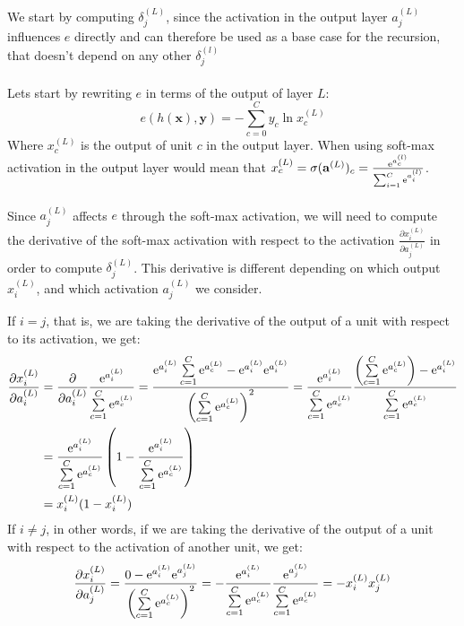 We start by computing $\delta^{(L)}_j$, since the activation in the output layer $a^{(L)}_j$ influences $e$ directly and can therefore be used as a base case for the recursion, that doesn't depend on any other $\delta^{(l)}_j$
\\\\
Lets start by rewriting $e$ in terms of the output of layer $L$:
$$
e(h(\mathbf{x}), \mathbf{y}) = - \sum\limits_{c=0}^C y_c \ln x^{(L)}_c
$$
Where $x^{(L)}_c$ is the output of unit $c$ in the output layer. When using soft-max activation in the output layer would mean that $x^{(L)}_c = \sigma(\mathbf{a}^{(L)})_c = \frac{\mathrm{e}^{a^{(l)}_c}}{\sum_{i=1}^C\mathrm{e}^{a^{(l)}_i}}$.
\\\\
Since $a^{(L)}_j$ affects $e$ through the soft-max activation, we will need to compute the derivative of the soft-max activation with respect to the activation $\frac{\partial x^{(L)}_i}{\partial a^{(L)}_j}$ in order to compute $\delta^{(L)}_j$. This derivative is different depending on which output $x^{(L)}_i$, and which activation $a^{(L)}_j$ we consider.

If $i = j$, that is, we are taking the derivative of the output of a unit with respect to its activation, we get:
\begin{align*}
	\frac{\partial x^{(L)}_i}{\partial a^{(L)}_i} &= \frac{\partial}{\partial a^{(L)}_i} \frac{\mathrm{e}^{a^{(L)}_i}}{\sum\limits_{c=1}^C \mathrm{e}^{a^{(L)}_c}}
	= \frac{\mathrm{e}^{a^{(L)}_i}\sum\limits_{c=1}^C \mathrm{e}^{a^{(L)}_c} - \mathrm{e}^{a^{(L)}_i}\mathrm{e}^{a^{(L)}_i}}{\left( \sum\limits_{c=1}^C \mathrm{e}^{a^{(L)}_c} \right)^2}
	= \frac{\mathrm{e}^{a^{(L)}_i}}{\sum\limits_{c=1}^C \mathrm{e}^{a^{(L)}_c}} \frac{\left( \sum\limits_{c=1}^C \mathrm{e}^{a^{(L)}_c} \right) - \mathrm{e}^{a^{(L)}_i}}{\sum\limits_{c=1}^C \mathrm{e}^{a^{(L)}_c}} \\
	&= \frac{\mathrm{e}^{a^{(L)}_i}}{\sum\limits_{c=1}^C \mathrm{e}^{a^{(L)}_c}} \left( 1 - \frac{\mathrm{e}^{a^{(L)}_i}}{\sum\limits_{c=1}^C \mathrm{e}^{a^{(L)}_c}} \right)\\
	&= x^{(L)}_i(1 - x^{(L)}_i)
\end{align*}
If $i \neq j$, in other words, if we are taking the derivative of the output of a unit with respect to the activation of another unit, we get:
\begin{align*}
	\frac{\partial x^{(L)}_i}{\partial a^{(L)}_j} = \frac{0 - \mathrm{e}^{a^{(L)}_i} \mathrm{e}^{a^{(L)}_j}}{\left( \sum\limits_{c=1}^C \mathrm{e}^{a^{(L)}_c} \right)^2} = - \frac{\mathrm{e}^{a^{(L)}_i}}{\sum\limits_{c=1}^C \mathrm{e}^{a^{(L)}_c}} \frac{\mathrm{e}^{a^{(L)}_j}}{\sum\limits_{c=1}^C \mathrm{e}^{a^{(L)}_c}} = - x^{(L)}_i x^{(L)}_j
\end{align*}

